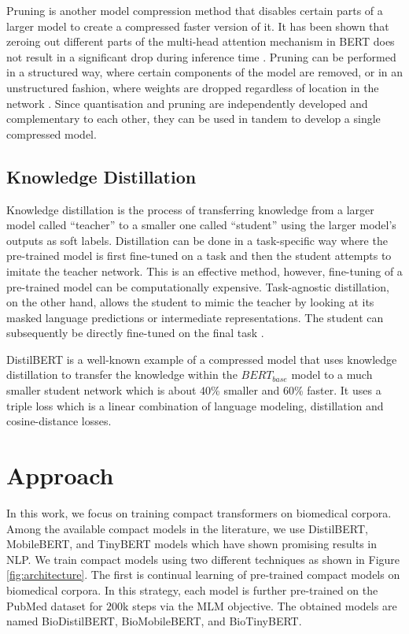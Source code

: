 \documentclass{article}
\begin{document}
Pruning is another model compression method that disables certain parts of a larger model to create a compressed faster version of it. It has been shown that zeroing out different parts of the multi-head attention mechanism in BERT does not result in a significant drop during inference time \citep{michel2019sixteen}. Pruning can be performed in a structured way, where certain components of the model are removed, or in an unstructured fashion, where weights are dropped regardless of location in the network \citep{rogers2020primer}. Since quantisation and pruning are independently developed and complementary to each other, they can be used in tandem to develop a single compressed model. 

\subsection{Knowledge Distillation}

Knowledge distillation \citep{hinton2015distilling} is the process of transferring knowledge from a larger model called ``teacher'' to a smaller one called ``student'' using the larger model's outputs as soft labels. Distillation can be done in a task-specific way where the pre-trained model is first fine-tuned on a task and then the student attempts to imitate the teacher network. This is an effective method, however, fine-tuning of a pre-trained model can be computationally expensive. Task-agnostic distillation, on the other hand, allows the student to mimic the teacher by looking at its masked language predictions or intermediate representations. The student can subsequently be directly fine-tuned on the final task \citep{wang2020minilm, yao2021adapt}. 

DistilBERT is a well-known example of a compressed model that uses knowledge distillation to transfer the knowledge within the $BERT_{base}$ model to a much smaller student network which is about $40$\% smaller and $60$\% faster. It uses a triple loss which is a linear combination of language modeling, distillation and cosine-distance losses.





\section{Approach}

In this work, we focus on training compact transformers on biomedical corpora. Among the available compact models in the literature, we use DistilBERT, MobileBERT, and TinyBERT models which have shown promising results in NLP. We train compact models using two different techniques as shown in Figure \ref{fig:architecture}. The first is continual learning of pre-trained compact models on biomedical corpora. In this strategy, each  model is further pre-trained on the PubMed dataset for $200$k steps via the MLM objective. The obtained models are named BioDistilBERT, BioMobileBERT, and BioTinyBERT.
\end{document}

